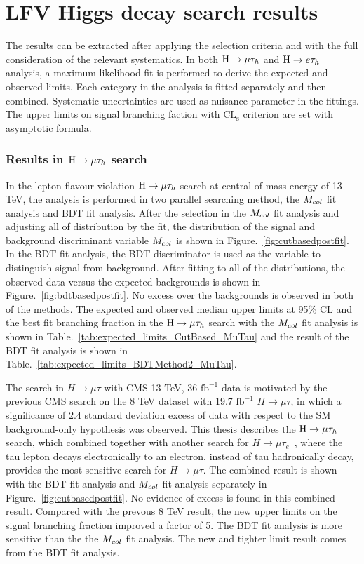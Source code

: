 \chapter{LFV Higgs decay search results}

The results can be extracted after applying the selection criteria and with the full consideration of the relevant systematics.  In both $\mathrm{H}\to \mu\tau_{h}$ and $\mathrm{H} \to e \tau_{h}$ analysis, a maximum likelihood fit is performed to derive the expected and observed limits.  Each category in the analysis is fitted separately and then combined. Systematic uncertainties are used as nuisance parameter in the fittings.  The upper limits on signal branching faction with $\textrm{CL}_{\textrm{s}}$ criterion are set with asymptotic formula. 

\subsection{Results in $\mathrm{H}\to \mu\tau_{h}$ search}

In the lepton flavour violation $\mathrm{H}\to \mu\tau_{h}$ search at central of mass energy of 13 TeV, the analysis is performed in two parallel searching method, the $M_{col}$ fit analysis and BDT fit analysis. After the selection in the $M_{col}$ fit analysis and adjusting all of distribution by the fit,  the distribution of the signal and background discriminant variable $M_{col}$ is shown in Figure.~\ref{fig:cutbasedpostfit}. In the BDT fit analysis, the BDT discriminator is used as the variable to distinguish signal from background.  After fitting to all of the distributions, the observed data versus the expected backgrounds is shown in Figure.~\ref{fig:bdtbasedpostfit}. No excess over the backgrounds is observed in both of the methods. The expected and observed median upper limits at 95\% CL and the best fit branching fraction in the $\mathrm{H}\to \mu\tau_{h}$ search with the $M_{col}$ fit analysis is shown in Table.~\ref{tab:expected_limits_CutBased_MuTau}  and the result of the BDT fit analysis is shown in Table.~\ref{tab:expected_limits_BDTMethod2_MuTau}. 

The search in $H \to \mu \tau$ with CMS 13 TeV, 36 $\textrm{fb}^{-1}$ data is motivated by the previous CMS search on the 8 TeV dataset with 19.7 $\textrm{fb}^{-1}$ $H \to \mu \tau$, in which a significance of 2.4 standard deviation excess of data with respect to the SM background-only hypothesis was observed. This thesis describes the $\mathrm{H}\to \mu\tau_{h}$ search, which combined together with another search for $H \to \mu\tau_{e}$~\cite{paper:13TeVsearch}, where the tau lepton decays electronically to an electron, instead of tau hadronically decay, provides the most sensitive search for $H \to \mu \tau$. The combined result is shown with the BDT fit analysis and $M_{col}$ fit analysis separately in Figure.~\ref{fig:cutbasedpostfit}. No evidence of excess is found in this combined result. Compared with the prevous 8 TeV result, the new upper limits on the signal branching fraction improved a factor of 5. The BDT fit analysis is more sensitive than the the $M_{col}$ fit analysis. The new and tighter limit result comes from the BDT fit analysis.  



